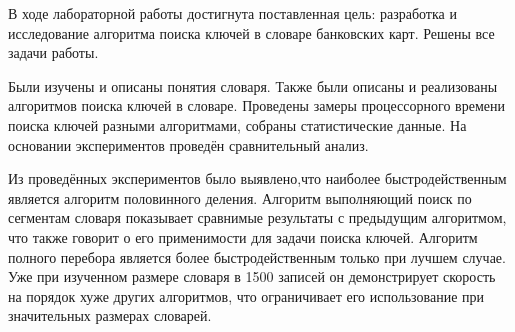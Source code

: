 В ходе лабораторной работы достигнута поставленная цель: разработка и исследование алгоритма поиска ключей в словаре банковских карт. Решены все задачи работы.

Были изучены и описаны понятия словаря. Также были описаны и реализованы алгоритмов поиска ключей в словаре. Проведены замеры процессорного времени поиска ключей разными алгоритмами, собраны статистические данные. На основании экспериментов проведён сравнительный анализ.

Из проведённых экспериментов было выявлено,что наиболее быстродейственным является алгоритм половинного деления. Алгоритм выполняющий поиск по сегментам словаря показывает сравнимые результаты с предыдущим алгоритмом, что также говорит о его применимости для задачи поиска ключей. Алгоритм полного перебора является более быстродейственным только при лучшем случае. Уже при изученном размере словаря в 1500 записей он демонстрирует скорость на порядок хуже других алгоритмов, что ограничивает его использование при значительных размерах словарей.